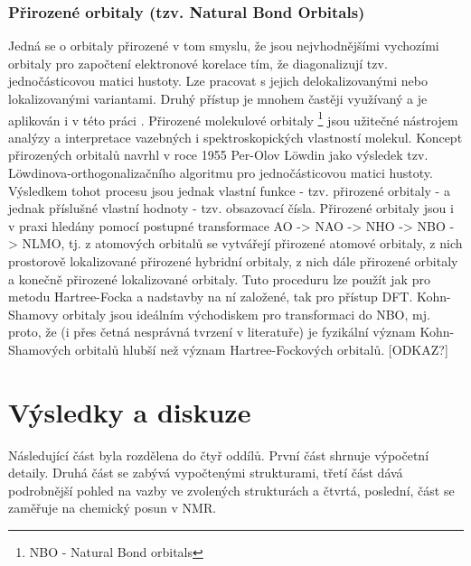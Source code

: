 \documentclass[
  digital, %
  table,   %
  lof,     %
  lot,     %
  oneside,
]{fithesis3}
\begin{document}
\subsection{Přirozené orbitaly (tzv. Natural Bond Orbitals)}
Jedná se o orbitaly přirozené v tom smyslu, že jsou nejvhodnějšími vychozími orbitaly pro započtení elektronové korelace tím, že diagonalizují tzv. jednočásticovou matici hustoty. Lze pracovat s jejich delokalizovanými nebo lokalizovanými variantami. Druhý přístup je mnohem častěji využívaný a je aplikován i v této práci \cite{weinhold2005valency} .
Přirozené molekulové orbitaly \footnote{NBO - Natural Bond orbitals} jsou užitečné nástrojem analýzy a interpretace vazebných i spektroskopických vlastností molekul. Koncept přirozených orbitalů navrhl v roce 1955 Per-Olov Löwdin jako výsledek tzv. Löwdinova-orthogonalizačního algoritmu pro jednočásticovou matici hustoty. Výsledkem tohot procesu jsou jednak vlastní funkce - tzv. přirozené orbitaly - a jednak příslušné vlastní hodnoty - tzv. obsazovací čísla. Přirozené orbitaly jsou i v praxi hledány pomocí postupné transformace AO -> NAO -> NHO -> NBO -> NLMO, tj. z atomových orbitalů se vytvářejí přirozené atomové orbitaly, z nich prostorově lokalizované přirozené hybridní orbitaly, z nich dále přirozené orbitaly  a konečně přirozené lokalizované orbitaly. Tuto proceduru lze použít jak pro metodu Hartree-Focka a nadstavby na ní založené, tak pro přístup DFT. Kohn-Shamovy orbitaly jsou ideálním východiskem pro transformaci do NBO, mj. proto, že (i přes četná nesprávná tvrzení v literatuře) je fyzikální význam Kohn-Shamových orbitalů hlubší než význam Hartree-Fockových orbitalů.  [ODKAZ?]




\chapter{Výsledky a diskuze}
Následující část byla rozdělena do čtyř oddílů. První část shrnuje výpočetní detaily. Druhá  část se zabývá vypočtenými strukturami, třetí část dává podrobnější pohled na vazby ve zvolených strukturách a čtvrtá, poslední, část se zaměřuje na chemický posun v NMR.
\end{document}
